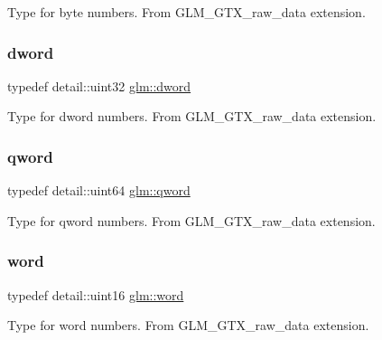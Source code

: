 Type for byte numbers. From G\+L\+M\+\_\+\+G\+T\+X\+\_\+raw\+\_\+data extension. \mbox{\label{group__gtx__raw__data_ga1fc2589df6d44e923cd1820cf14805cf}} 
\subsubsection{\texorpdfstring{dword}{dword}}
{\footnotesize\ttfamily typedef detail\+::uint32 \hyperlink{group__gtx__raw__data_ga1fc2589df6d44e923cd1820cf14805cf}{glm\+::dword}}

Type for dword numbers. From G\+L\+M\+\_\+\+G\+T\+X\+\_\+raw\+\_\+data extension. \mbox{\label{group__gtx__raw__data_ga32447af289e879589883c9b7e3be1246}} 
\subsubsection{\texorpdfstring{qword}{qword}}
{\footnotesize\ttfamily typedef detail\+::uint64 \hyperlink{group__gtx__raw__data_ga32447af289e879589883c9b7e3be1246}{glm\+::qword}}

Type for qword numbers. From G\+L\+M\+\_\+\+G\+T\+X\+\_\+raw\+\_\+data extension. \mbox{\label{group__gtx__raw__data_ga5617a479d471021b5c773c5e969ba46d}} 
\subsubsection{\texorpdfstring{word}{word}}
{\footnotesize\ttfamily typedef detail\+::uint16 \hyperlink{group__gtx__raw__data_ga5617a479d471021b5c773c5e969ba46d}{glm\+::word}}

Type for word numbers. From G\+L\+M\+\_\+\+G\+T\+X\+\_\+raw\+\_\+data extension. 